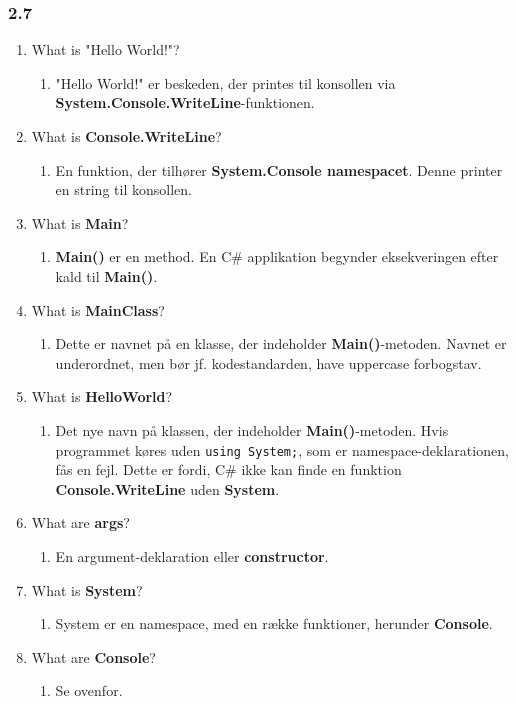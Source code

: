 \documentclass[a4paper,10pt]{article}
\begin{document}
\subsubsection*{2.7}
\begin{enumerate}
  \item What is "Hello World!"?
  \begin{enumerate}
    \item "Hello World!" er beskeden, der printes til konsollen via \textbf{System.Console.WriteLine}-funktionen.
  \end{enumerate}
  \item What is \textbf{Console.WriteLine}?
  \begin{enumerate}
    \item En funktion, der tilhører \textbf{System.Console namespacet}. Denne printer en string til konsollen.
  \end{enumerate}
  \item What is \textbf{Main}?
  \begin{enumerate}
    \item \textbf{Main()} er en method. En C# applikation begynder eksekveringen efter kald til \textbf{Main()}.
  \end{enumerate}
  \item What is \textbf{MainClass}?
  \begin{enumerate}
    \item Dette er navnet på en klasse, der indeholder \textbf{Main()}-metoden. Navnet er underordnet, men bør jf. kodestandarden, have uppercase forbogstav.
  \end{enumerate}
  \item What is \textbf{HelloWorld}?
  \begin{enumerate}
    \item Det nye navn på klassen, der indeholder \textbf{Main()}-metoden. Hvis programmet køres uden \texttt{using System;}, som er namespace-deklarationen, fås en fejl. Dette er fordi, C# ikke kan finde en funktion \textbf{Console.WriteLine} uden \textbf{System}. 
  \end{enumerate}
  \item What are \textbf{args}?
  \begin{enumerate}
    \item En argument-deklaration eller \textbf{constructor}.
  \end{enumerate}
  \item What is \textbf{System}?
  \begin{enumerate}
    \item System er en namespace, med en række funktioner, herunder \textbf{Console}.
  \end{enumerate}
  \item What are \textbf{Console}?
  \begin{enumerate}
    \item Se ovenfor.
  \end{enumerate}
\end{enumerate}
\end{document}
